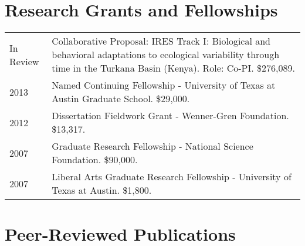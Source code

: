 \documentclass{article}
\begin{document}
\section*{Research Grants and Fellowships}
\begin{tabular}{p{}p{}}
In Review & Collaborative Proposal: IRES Track I: Biological and behavioral adaptations to ecological variability through time in the Turkana Basin (Kenya). Role: Co-PI. \$276,089.\\[4pt]
2013 & Named Continuing Fellowship - University of Texas at Austin Graduate School. \$29,000.\\[4pt]
2012  & Dissertation Fieldwork Grant - Wenner-Gren Foundation. \$13,317.\\[4pt]
2007 &  Graduate Research Fellowship - National Science Foundation. \$90,000.\\[4pt]
2007 &  Liberal Arts Graduate Research Fellowship - University of Texas at Austin. \$1,800.\\[4pt]

\end{tabular}



\section*{Peer-Reviewed Publications}
\end{document}

